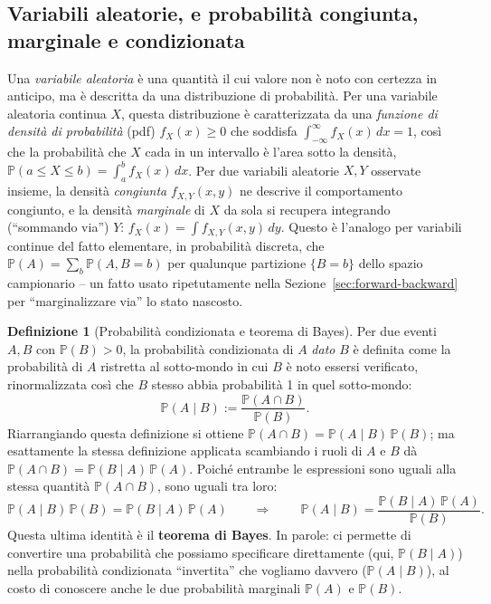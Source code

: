 \documentclass[11pt]{article}
\theoremstyle{definition}
\newtheorem{definition}[theorem]{Definizione}
\theoremstyle{remark}
\begin{document}
\subsection{Variabili aleatorie, e probabilit\`a congiunta, marginale e condizionata}

Una \emph{variabile aleatoria} \`e una quantit\`a il cui valore non \`e noto con certezza in anticipo, ma \`e descritta da una distribuzione di probabilit\`a. Per una variabile aleatoria continua $X$, questa distribuzione \`e caratterizzata da una \emph{funzione di densit\`a di probabilit\`a} (pdf) $f_X(x)\ge0$ che soddisfa $\int_{-\infty}^{\infty}f_X(x)\,dx=1$, cos\`i che la probabilit\`a che $X$ cada in un intervallo \`e l'area sotto la densit\`a, $\mathbb{P}(a\le X\le b)=\int_a^b f_X(x)\,dx$. Per due variabili aleatorie $X,Y$ osservate insieme, la densit\`a \emph{congiunta} $f_{X,Y}(x,y)$ ne descrive il comportamento congiunto, e la densit\`a \emph{marginale} di $X$ da sola si recupera integrando (``sommando via'') $Y$: $f_X(x)=\int f_{X,Y}(x,y)\,dy$. Questo \`e l'analogo per variabili continue del fatto elementare, in probabilit\`a discreta, che $\mathbb{P}(A)=\sum_b\mathbb{P}(A,B=b)$ per qualunque partizione $\{B=b\}$ dello spazio campionario -- un fatto usato ripetutamente nella Sezione~\ref{sec:forward-backward} per ``marginalizzare via'' lo stato nascosto.

\begin{definition}[Probabilit\`a condizionata e teorema di Bayes]
Per due eventi $A,B$ con $\mathbb{P}(B)>0$, la probabilit\`a condizionata di $A$ \emph{dato} $B$ \`e definita come la probabilit\`a di $A$ ristretta al sotto-mondo in cui $B$ \`e noto essersi verificato, rinormalizzata cos\`i che $B$ stesso abbia probabilit\`a 1 in quel sotto-mondo:
\[
\mathbb{P}(A\mid B) := \frac{\mathbb{P}(A\cap B)}{\mathbb{P}(B)}.
\]
Riarrangiando questa definizione si ottiene $\mathbb{P}(A\cap B)=\mathbb{P}(A\mid B)\,\mathbb{P}(B)$; ma esattamente la stessa definizione applicata scambiando i ruoli di $A$ e $B$ d\`a $\mathbb{P}(A\cap B)=\mathbb{P}(B\mid A)\,\mathbb{P}(A)$. Poich\'e entrambe le espressioni sono uguali alla stessa quantit\`a $\mathbb{P}(A\cap B)$, sono uguali tra loro:
\[
\mathbb{P}(A\mid B)\,\mathbb{P}(B) = \mathbb{P}(B\mid A)\,\mathbb{P}(A) \qquad\Longrightarrow\qquad
\boxed{\ \mathbb{P}(A\mid B) = \frac{\mathbb{P}(B\mid A)\,\mathbb{P}(A)}{\mathbb{P}(B)}. \ }
\]
Questa ultima identit\`a \`e il \textbf{teorema di Bayes}. In parole: ci permette di convertire una probabilit\`a che possiamo specificare direttamente (qui, $\mathbb{P}(B\mid A)$) nella probabilit\`a condizionata ``invertita'' che vogliamo davvero ($\mathbb{P}(A\mid B)$), al costo di conoscere anche le due probabilit\`a marginali $\mathbb{P}(A)$ e $\mathbb{P}(B)$.
\end{definition}
\end{document}
